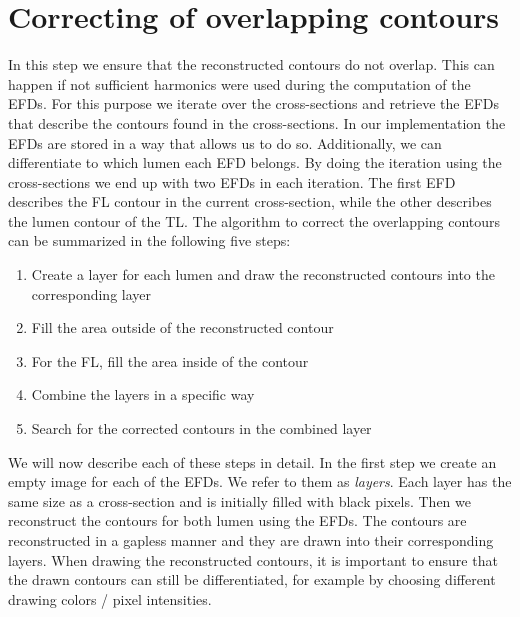 \documentclass[thesis.tex]{subfiles}
\begin{document}
\section{Correcting of overlapping contours}
In this step we ensure that the reconstructed contours do not overlap. This can happen if not sufficient harmonics were used during the computation of the EFDs. For this purpose we iterate over the cross-sections and retrieve the EFDs that describe the contours found in the cross-sections. In our implementation the EFDs are stored in a way that allows us to do so. Additionally, we can differentiate to which lumen each EFD belongs. By doing the iteration using the cross-sections we end up with two EFDs in each iteration. The first EFD describes the FL contour in the current cross-section, while the other describes the lumen contour of the TL. 
The algorithm to correct the overlapping contours can be summarized in the following five steps:

\begin{enumerate}
\item Create a layer for each lumen and draw the reconstructed contours into the corresponding layer
\item Fill the area outside of the reconstructed contour
\item For the FL, fill the area inside of the contour
\item Combine the layers in a specific way
\item Search for the corrected contours in the combined layer
\end{enumerate}

We will now describe each of these steps in detail. In the first step we create an empty image for each of the EFDs. We refer to them as \textit{layers}. Each layer has the same size as a cross-section and is initially filled with black pixels. Then we reconstruct the contours for both lumen using the EFDs. The contours are reconstructed in a gapless manner and they are drawn into their corresponding layers. When drawing the reconstructed contours, it is important to ensure that the drawn contours can still be differentiated, for example by choosing different drawing colors / pixel intensities. 
\end{document}
